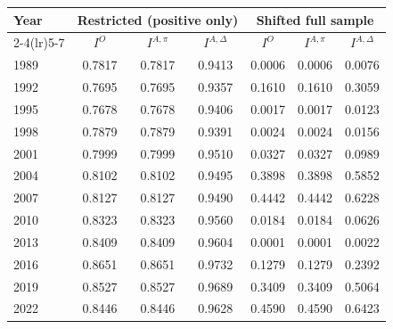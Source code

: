 \begin{tabular}{lcccccc}
\toprule
Year & \multicolumn{3}{c}{Restricted (positive only)} & \multicolumn{3}{c}{Shifted full sample} \\
\cmidrule(lr){2-4}\cmidrule(lr){5-7}
& $I^{O}$ & $I^{A,\pi}$ & $I^{A,\Delta}$ & $I^{O}$ & $I^{A,\pi}$ & $I^{A,\Delta}$ \\
\midrule
1989 & 0.7817 & 0.7817 & 0.9413 & 0.0006 & 0.0006 & 0.0076 \\
1992 & 0.7695 & 0.7695 & 0.9357 & 0.1610 & 0.1610 & 0.3059 \\
1995 & 0.7678 & 0.7678 & 0.9406 & 0.0017 & 0.0017 & 0.0123 \\
1998 & 0.7879 & 0.7879 & 0.9391 & 0.0024 & 0.0024 & 0.0156 \\
2001 & 0.7999 & 0.7999 & 0.9510 & 0.0327 & 0.0327 & 0.0989 \\
2004 & 0.8102 & 0.8102 & 0.9495 & 0.3898 & 0.3898 & 0.5852 \\
2007 & 0.8127 & 0.8127 & 0.9490 & 0.4442 & 0.4442 & 0.6228 \\
2010 & 0.8323 & 0.8323 & 0.9560 & 0.0184 & 0.0184 & 0.0626 \\
2013 & 0.8409 & 0.8409 & 0.9604 & 0.0001 & 0.0001 & 0.0022 \\
2016 & 0.8651 & 0.8651 & 0.9732 & 0.1279 & 0.1279 & 0.2392 \\
2019 & 0.8527 & 0.8527 & 0.9689 & 0.3409 & 0.3409 & 0.5064 \\
2022 & 0.8446 & 0.8446 & 0.9628 & 0.4590 & 0.4590 & 0.6423 \\
\bottomrule
\end{tabular}

